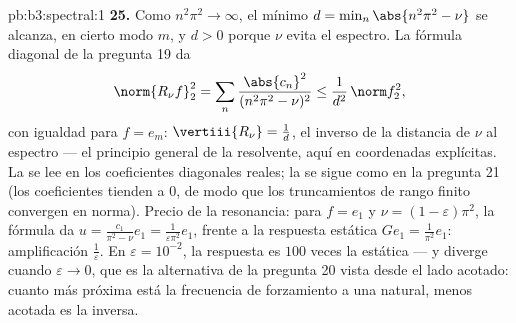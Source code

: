 \begin{solution}{pb:b3:spectral:1}
\textbf{25.} Como $n^2\pi^2 \to \infty$, el mínimo $d =
\min_n\abs{n^2\pi^2 - \nu}$ se alcanza, en cierto modo $m$, y $d > 0$
porque $\nu$ evita el espectro. La fórmula diagonal de la pregunta 19 da
\[
\norm{R_\nu f}_2^2 =
\sum_n\frac{\abs{c_n}^2}{(n^2\pi^2 - \nu)^2}
\leq \frac1{d^2}\,\norm f_2^2,
\]
con igualdad para $f = e_m$: $\vertiii{R_\nu} = \frac1d$, el inverso de
la distancia de $\nu$ al espectro --- el principio general de la
resolvente, aquí en coordenadas explícitas. La
 se lee en los
coeficientes diagonales reales; la  se sigue como en la
pregunta 21 (los coeficientes tienden a $0$, de modo que los
truncamientos de rango finito convergen en norma). Precio de la
resonancia: para $f = e_1$ y $\nu =
(1-\varepsilon)\pi^2$, la fórmula da $u =
\frac{c_1}{\pi^2 - \nu}e_1 = \frac1{\varepsilon\pi^2}e_1$, frente a la
respuesta estática $Ge_1 = \frac1{\pi^2}e_1$: amplificación
$\frac1\varepsilon$. En $\varepsilon =
10^{-2}$, la respuesta es $100$ veces la estática --- y diverge cuando
$\varepsilon \to 0$, que es la alternativa de la pregunta 20 vista desde
el lado acotado: cuanto más próxima está la frecuencia de forzamiento a
una natural, menos acotada es la inversa.
\end{solution}
